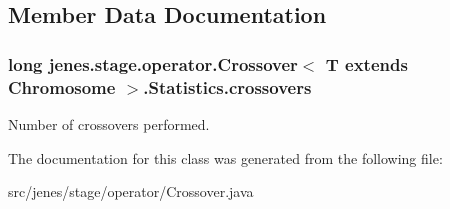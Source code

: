 \subsection{Member Data Documentation}
\hypertarget{classjenes_1_1stage_1_1operator_1_1_crossover_3_01_t_01extends_01_chromosome_01_4_1_1_statistics_bf1983cc628b3283b942dc68cc871bbc}{
\subsubsection[crossovers]{\setlength{\rightskip}{0pt plus 5cm}long jenes.stage.operator.Crossover$<$ T extends Chromosome $>$.Statistics.crossovers}}
\label{classjenes_1_1stage_1_1operator_1_1_crossover_3_01_t_01extends_01_chromosome_01_4_1_1_statistics_bf1983cc628b3283b942dc68cc871bbc}


Number of crossovers performed. 

The documentation for this class was generated from the following file:\begin{CompactItemize}
\item 
src/jenes/stage/operator/Crossover.java\end{CompactItemize}
